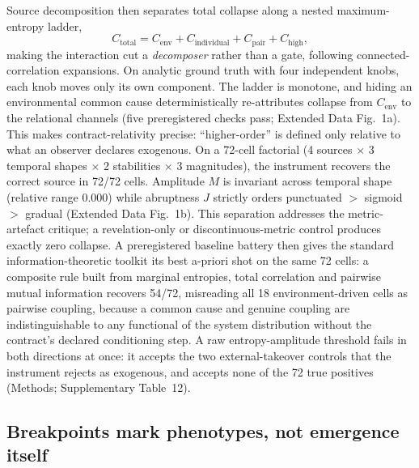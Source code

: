 \documentclass[11pt]{article}
\begin{document}
Source decomposition then separates total collapse
along a nested maximum-entropy ladder,
\begin{equation}
C_\mathrm{total} = C_\mathrm{env} + C_\mathrm{individual}
+ C_\mathrm{pair} + C_\mathrm{high},
\end{equation}
making the interaction cut a \emph{decomposer} rather than a gate,
following connected-correlation expansions\citep{schneidman2003network}.
On analytic ground truth with four independent knobs, each knob moves
only its own component. The ladder is monotone, and hiding an
environmental common cause deterministically re-attributes collapse
from $C_\mathrm{env}$ to the relational channels (five preregistered
checks pass; Extended Data Fig.~1a). This makes contract-relativity
precise: ``higher-order'' is defined only relative to what an observer
declares exogenous. On a 72-cell factorial (4 sources $\times$ 3
temporal shapes $\times$ 2 stabilities $\times$ 3 magnitudes), the
instrument recovers the correct source in 72/72 cells. Amplitude $M$
is invariant
across temporal shape (relative range 0.000) while abruptness $J$
strictly orders punctuated $>$ sigmoid $>$ gradual (Extended Data
Fig.~1b). This separation addresses the metric-artefact
critique\citep{schaeffer2023emergent}; a revelation-only or
discontinuous-metric control produces exactly zero collapse.
A preregistered baseline battery then gives the standard
information-theoretic toolkit its best a-priori shot on the same 72
cells: a composite rule built from marginal entropies, total
correlation and pairwise mutual information recovers 54/72, misreading
all 18 environment-driven cells as pairwise coupling, because a common
cause and genuine coupling are indistinguishable to any functional of
the system distribution without the contract's declared conditioning
step. A raw entropy-amplitude threshold fails in both directions at
once: it accepts the two external-takeover controls that the
instrument rejects as exogenous, and accepts none of the 72 true
positives (Methods; Supplementary Table~12).

\subsection*{Breakpoints mark phenotypes, not emergence itself}
\end{document}
